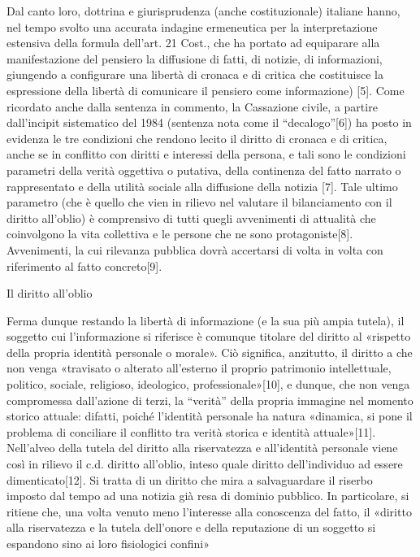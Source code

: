 Dal canto loro, dottrina e giurisprudenza (anche costituzionale) italiane hanno, nel tempo svolto una accurata indagine ermeneutica per la interpretazione estensiva della formula dell’art. 21 Cost., che ha portato ad equiparare alla manifestazione del pensiero la diffusione di fatti, di notizie, di informazioni, giungendo a configurare una libertà di cronaca e di critica che costituisce la espressione della libertà di comunicare il pensiero come informazione) [5]. Come ricordato anche dalla sentenza in commento, la Cassazione civile, a partire dall’incipit sistematico del 1984 (sentenza nota come il “decalogo”[6]) ha posto in evidenza le tre condizioni che rendono lecito il diritto di cronaca e di critica, anche se in conflitto con diritti e interessi della persona, e tali sono le condizioni parametri della verità oggettiva o putativa, della continenza del fatto narrato o rappresentato e della utilità sociale alla diffusione della notizia [7]. Tale ultimo parametro (che è quello che vien in rilievo nel valutare il bilanciamento con il diritto all’oblio) è comprensivo di tutti quegli avvenimenti di attualità che coinvolgono la vita collettiva e le persone che ne sono protagoniste[8]. Avvenimenti, la cui rilevanza pubblica dovrà accertarsi di volta in volta con riferimento al fatto concreto[9].



Il diritto all’oblio

Ferma dunque restando la libertà di informazione (e la sua più ampia tutela), il soggetto cui l’informazione si riferisce è comunque titolare del diritto al «rispetto della propria identità personale o morale». Ciò significa, anzitutto, il diritto a che non venga «travisato o alterato all’esterno il proprio patrimonio intellettuale, politico, sociale, religioso, ideologico, professionale»[10], e dunque, che non venga compromessa dall’azione di terzi, la “verità” della propria immagine nel momento storico attuale: difatti, poiché l’identità personale ha natura «dinamica, si pone il problema di conciliare il conflitto tra verità storica e identità attuale»[11]. Nell’alveo della tutela del diritto alla riservatezza e all’identità personale viene così in rilievo il c.d. diritto all’oblio, inteso quale diritto dell’individuo ad essere dimenticato[12]. Si tratta di un diritto che mira a salvaguardare il riserbo imposto dal tempo ad una notizia già resa di dominio pubblico. In particolare, si ritiene che, una volta venuto meno l’interesse alla conoscenza del fatto, il «diritto alla riservatezza e la tutela dell’onore e della reputazione di un soggetto si espandono sino ai loro fisiologici confini»

